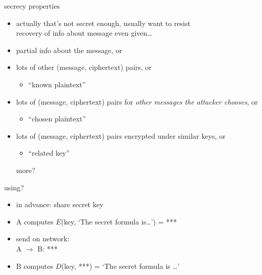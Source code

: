\begin{frame}{secrecy properties}
    \begin{itemize}
    \item actually that's not secret enough, usually want to resist \\
        recovery of info about message  even given\ldots
    \vspace{.5cm}
    \item partial info about the message, or
    \item lots of other (message, ciphertext) pairs, or
        \begin{itemize}
        \item ``known plaintext''
        \end{itemize}
    \item lots of (message, ciphertext) pairs for \textit{other messages the attacker chooses}, or
        \begin{itemize}
        \item ``chosen plaintext''
        \end{itemize}
    \item lots of (message, ciphertext) pairs encrypted under similar keys, or
        \begin{itemize}
        \item ``related key''
        \end{itemize}
    \item [more?]
    \end{itemize}
\end{frame}

\begin{frame}{using?}
    \begin{itemize}
    \item in advance: share secret key
    \vspace{.5cm}
    \item A computes $E$(key, `The secret formula is\ldots') = ***
    \item send on network: \\
    A $\rightarrow$ B: ***
    \item<2-> B computes $D$(key, ***) = `The secret formula is \ldots'
    \end{itemize}
\end{frame}

